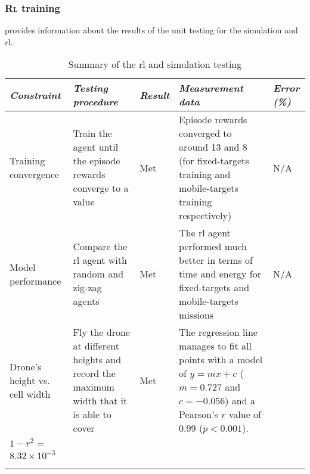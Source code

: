 \documentclass[../main.tex]{subfiles}
\begin{document}
\subsubsection{\textsc{Rl} training}

 provides information about the results
of the unit testing for the simulation and \gls{rl}.

\begin{table}[tbp]
    \centering
    \caption{Summary of the \gls{rl} and simulation testing}
    \label{tab:rl-testing-summary}
    \begin{tabularx}{\textwidth}{ X X l X l }
        \toprule
        \textit{Constraint} 
            & \textit{Testing procedure} 
                & \textit{Result}
        & \textit{Measurement data} 
            & \textit{Error (\%)} \\

        \midrule
        
        
        \raggedright Training convergence    
            & Train the agent until the episode rewards converge to a
            value
        & Met
        & Episode rewards converged to around 13 and 8 (for fixed-targets training
        and mobile-targets training respectively)
        & N/A \\
        \addlinespace

        \raggedright Model performance
        & Compare the \gls{rl} agent with random and zig-zag agents
        & Met
        & The \gls{rl} agent performed much better in terms of time
        and energy for fixed-targets and mobile-targets missions
        & N/A \\
        \addlinespace

        \raggedright Drone's height vs. cell width
        & Fly the drone at different heights and record the maximum
        width that it is able to cover
        & Met
        & The regression line manages to fit all points with a model
        of $y=mx+c$ ($m=0.727$ and $c=-0.056$) and a
        Pearson's $r$ value of 0.99 ($p < 0.001$).
        & 
        \begin{tabular}{l}
            \\
            $1-r^2 =$ \\
            $8.32\times 10^{-3}$ \\
        \end{tabular}
        \\
        \addlinespace

        \bottomrule		
    \end{tabularx}
\end{table}
\end{document}
